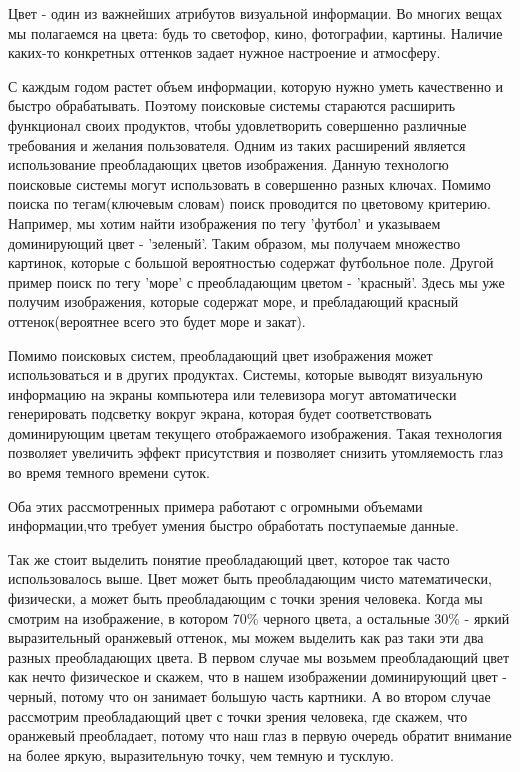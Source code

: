 \Introduction

Цвет - один из важнейших атрибутов визуальной информации. Во многих вещах мы полагаемся на цвета: будь то светофор, кино, фотографии, картины. Наличие каких-то конкретных оттенков задает нужное настроение и атмосферу. 

С каждым годом растет объем информации, которую нужно уметь качественно и быстро обрабатывать. Поэтому поисковые системы стараются расширить функционал своих продуктов, чтобы удовлетворить совершенно различные требования и желания пользователя. Одним из таких расширений является использование преобладающих цветов изображения. Данную технологю поисковые системы могут использовать в совершенно разных ключах. Помимо поиска по тегам(ключевым словам) поиск проводится по цветовому критерию. Например, мы хотим найти изображения по тегу 'футбол' и указываем доминирующий цвет - 'зеленый'. Таким образом, мы получаем множество картинок, которые с большой вероятностью содержат футбольное поле. Другой пример поиск  по тегу 'море' с преобладающим цветом - 'красный'. Здесь мы уже получим изображения, которые содержат море, и пребладающий красный оттенок(вероятнее всего это будет море и закат). 

Помимо поисковых систем, преобладающий цвет изображения может использоваться и в других продуктах. Системы, которые выводят визуальную информацию на экраны компьютера или телевизора могут автоматически генерировать подсветку вокруг экрана, которая будет соответствовать доминирующим цветам текущего отображаемого изображения. Такая технология позволяет увеличить эффект присутствия и позволяет снизить утомляемость глаз во время темного времени суток.

Оба этих рассмотренных примера работают с огромными объемами информации,что требует умения быстро обработать поступаемые данные.

Так же стоит выделить понятие преобладающий цвет, которое так часто использовалось выше. Цвет может быть преобладающим чисто математически, физически, а может быть преобладающим с точки зрения человека. Когда мы смотрим на изображение, в котором 70\% черного цвета, а остальные 30\% - яркий выразительный оранжевый оттенок, мы можем выделить как раз таки эти два разных преобладающих цвета. В первом случае мы возьмем преобладающий цвет как нечто физическое и скажем, что в нашем изображении доминирующий цвет - черный, потому что он занимает большую часть картники. А во втором случае рассмотрим преобладающий цвет с точки зрения человека, где скажем, что оранжевый преобладает, потому что наш глаз в первую очередь обратит внимание на более яркую, выразительную точку, чем темную и тусклую.
